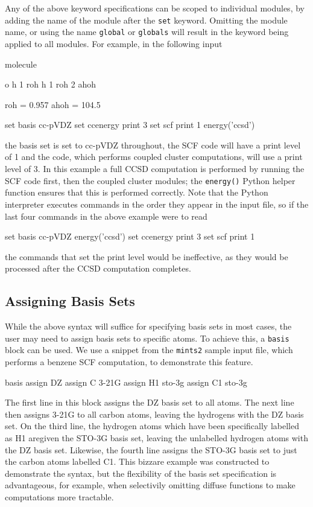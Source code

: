 Any of the above keyword specifications can be scoped to individual modules,
by adding the name of the module after the {\tt set} keyword. Omitting the module
name, or using the name {\tt global} or {\tt globals} will result in the keyword being
applied to all modules. For example, in the following input
\begin{Snippet}
molecule{
  o
  h 1 roh
  h 1 roh 2 ahoh

  roh = 0.957
  ahoh = 104.5
}

set basis cc-pVDZ
set ccenergy print 3
set scf print 1
energy('ccsd')
\end{Snippet}
the basis set is set to cc-pVDZ throughout, the SCF code will have a print
level of 1 and the \PSIccenergy code, which performs coupled cluster computations,
will use a print level of 3. In this example a full CCSD computation is
performed by running the SCF code first, then the coupled cluster modules;
the {\tt energy()} Python helper function ensures that this is performed correctly.
Note that the Python interpreter executes commands in the order they appear in
the input file, so if the last four commands in the above example were to read
\begin{Snippet}
set basis cc-pVDZ
energy('ccsd')
set ccenergy print 3
set scf print 1
\end{Snippet}
the commands that set the print level would be ineffective, as they would be
processed after the CCSD computation completes. 

\subsection{Assigning Basis Sets} \label{sec:PsithonBasisSets}
While the above syntax will suffice for specifying basis sets in most cases,
the user may need to assign basis sets to specific atoms.  To achieve this, a
{\tt basis} block can be used.  We use a snippet from the {\tt mints2} sample
input file, which performs a benzene SCF computation, to demonstrate this
feature.

\begin{Snippet}
basis {
   assign DZ
   assign C 3-21G
   assign H1 sto-3g
   assign C1 sto-3g
}
\end{Snippet}

The first line in this block assigns the DZ basis set to all atoms.  The next
line then assigns 3-21G to all carbon atoms, leaving the hydrogens with the DZ
basis set.  On the third line, the hydrogen atoms which have been specifically
labelled as H1 aregiven the STO-3G basis set, leaving the unlabelled hydrogen
atoms with the DZ basis set.  Likewise, the fourth line assigns the STO-3G
basis set to just the carbon atoms labelled C1.  This bizzare example was
constructed to demonstrate the syntax, but the flexibility of the basis set
specification is advantageous, for example, when selectivily omitting diffuse
functions to make computations more tractable.

